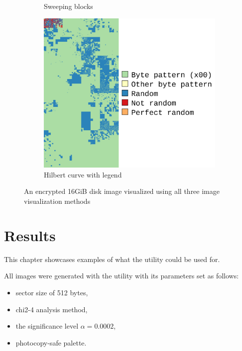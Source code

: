\documentclass[
  digital, %
  color,   %
  oneside, %
  lof,     %
  nolot,     %
]{fithesis4}
\begin{document}
\begin{figure}
\begin{subfigure}[t]{.45\textwidth}
        \caption{Sweeping blocks}
        \label{fig:impl-sweeping-blocks}
    \end{subfigure}
    \begin{subfigure}[t]{.6\textwidth}
        \centering
        \includegraphics[width=\textwidth,interpolate=false]{pv204_fde-chi2-4-hilbert.png}
        \caption{Hilbert curve with legend}
        \label{fig:impl-hilbert-curve}
    \end{subfigure}
    \caption{An encrypted 16GiB disk image visualized using all three image visualization methods}
    \label{fig:impl-visualizations}
\end{figure}

\chapter{Results}
\label{chap:results}
This chapter showcases examples of what the utility could be used for.

All images were generated with the utility with its parameters set as follows:
\begin{itemize}
  \item sector size of 512 bytes,
  \item chi2-4 analysis method,
  \item the significance level $\alpha = 0.0002$,
  \item photocopy-safe palette.
\end{itemize}
\end{document}

